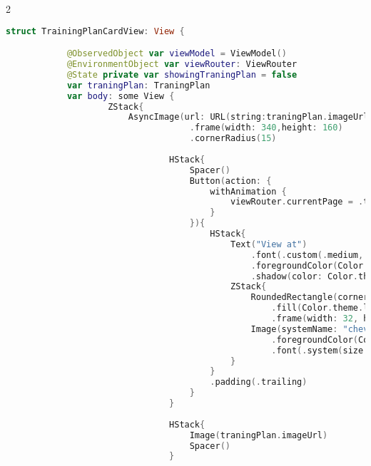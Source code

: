 \begin{spacing}{2}
\end{spacing}
\begin{minipage}{\textwidth}
    \linespread{0.8}\selectfont
    \begin{lstlisting}[language=swift]
        struct TrainingPlanCardView: View {

            @ObservedObject var viewModel = ViewModel()
            @EnvironmentObject var viewRouter: ViewRouter 
            @State private var showingTraningPlan = false
            var traningPlan: TraningPlan 
            var body: some View {
                    ZStack{
                        AsyncImage(url: URL(string:traningPlan.imageUrl))
                                    .frame(width: 340,height: 160)
                                    .cornerRadius(15)
        
                                HStack{
                                    Spacer()
                                    Button(action: {
                                        withAnimation {
                                            viewRouter.currentPage = .traningPage
                                        }
                                    }){
                                        HStack{
                                            Text("View at")
                                                .font(.custom(.medium, size: 30))
                                                .foregroundColor(Color.theme.white)
                                                .shadow(color: Color.theme.darkGray.opacity(0.25), radius: 5, x: 0, y: 4)
                                            ZStack{
                                                RoundedRectangle(cornerRadius: 50)
                                                    .fill(Color.theme.lighBlue)
                                                    .frame(width: 32, height: 32)
                                                Image(systemName: "chevron.right")
                                                    .foregroundColor(Color.theme.white)
                                                    .font(.system(size: 20))
                                            }
                                        }
                                        .padding(.trailing)
                                    }
                                }
                        
                                HStack{
                                    Image(traningPlan.imageUrl)
                                    Spacer()
                                }
                                

\end{lstlisting}
\end{minipage}
